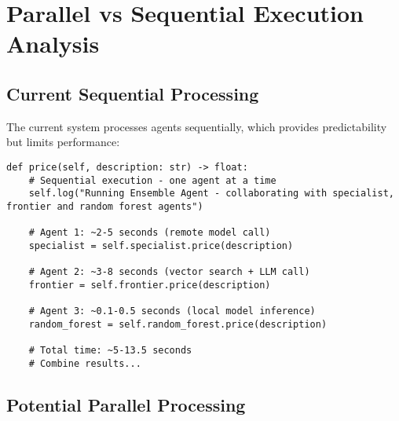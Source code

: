 \section{Parallel vs Sequential Execution Analysis}

\subsection{Current Sequential Processing}

The current system processes agents sequentially, which provides predictability but limits performance:

\begin{lstlisting}[caption=Sequential Agent Execution]
def price(self, description: str) -> float:
    # Sequential execution - one agent at a time
    self.log("Running Ensemble Agent - collaborating with specialist, frontier and random forest agents")
    
    # Agent 1: ~2-5 seconds (remote model call)
    specialist = self.specialist.price(description)
    
    # Agent 2: ~3-8 seconds (vector search + LLM call)
    frontier = self.frontier.price(description)
    
    # Agent 3: ~0.1-0.5 seconds (local model inference)
    random_forest = self.random_forest.price(description)
    
    # Total time: ~5-13.5 seconds
    # Combine results...
\end{lstlisting}

\subsection{Potential Parallel Processing}

